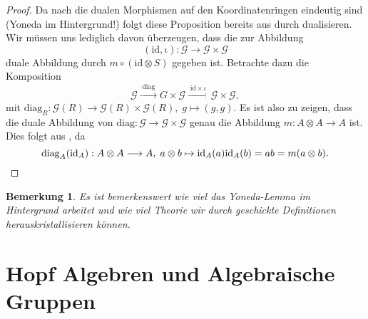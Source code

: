 \documentclass[a4paper, 11pt]{scrartcl}
\newcommand{\id}{\text{id}}
\theoremstyle{basicstyle}
\newtheorem{bemerkung}[definition]{Bemerkung}
\begin{document}
    \begin{proof}
        Da nach  die dualen Morphismen auf den Koordinatenringen eindeutig sind (Yoneda im Hintergrund!) folgt diese Proposition bereits aus  durch dualisieren.
        Wir müssen uns lediglich davon überzeugen, dass die zur Abbildung \[(\id, \iota): \mathcal{G} \to \mathcal{G} \times \mathcal{G}\]
        duale Abbildung durch \(m \circ (\id \otimes S)\) gegeben ist.
        Betrachte dazu die Komposition
        \[\mathcal{G} \xrightarrow{\;\text{diag}\;} G \times \mathcal{G} \xrightarrow{\;\id \times \iota\;} \mathcal{G} \times \mathcal{G},\]
        mit \(\text{diag}_R: \mathcal{G}(R) \to \mathcal{G}(R) \times \mathcal{G}(R), \; g \mapsto (g, g)\).
        Es ist also zu zeigen, dass die duale Abbildung von \(\text{diag}: \mathcal{G} \to \mathcal{G} \times \mathcal{G}\) genau die Abbildung \(m: A \otimes A \to A\) ist.
        Dies folgt aus , da 
        \[\text{diag}_A(\id_A): A \otimes A \longrightarrow A, \; a \otimes b \mapsto \id_A(a)\id_A(b) = ab = m(a \otimes b).\qedhere\]
    \end{proof}

    \begin{bemerkung}
        Es ist bemerkenswert wie viel das Yoneda-Lemma im Hintergrund arbeitet und wie viel Theorie wir durch geschickte Definitionen herauskristallisieren können.
    \end{bemerkung}

    
    \section{Hopf Algebren und Algebraische Gruppen}
\end{document}
